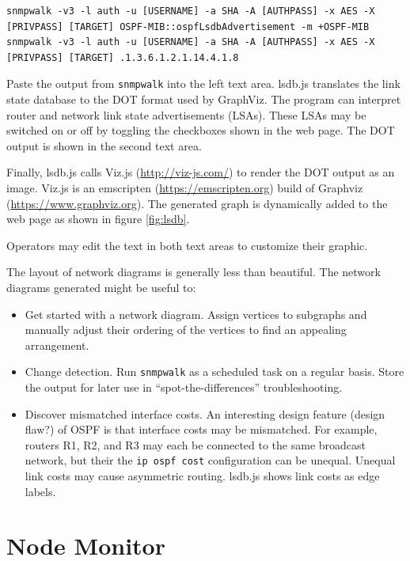 \documentclass[12pt]{article}
\begin{document}
\begin{lstlisting}
snmpwalk -v3 -l auth -u [USERNAME] -a SHA -A [AUTHPASS] -x AES -X [PRIVPASS] [TARGET] OSPF-MIB::ospfLsdbAdvertisement -m +OSPF-MIB
snmpwalk -v3 -l auth -u [USERNAME] -a SHA -A [AUTHPASS] -x AES -X [PRIVPASS] [TARGET] .1.3.6.1.2.1.14.4.1.8
\end{lstlisting}

Paste the output from \texttt{snmpwalk} into the left text area.
lsdb.js translates the link state database to the DOT format used by GraphViz.
The program can interpret router and network link state advertisements (LSAs).
These LSAs may be switched on or off by toggling the checkboxes shown in the web page.
The DOT output is shown in the second text area.

Finally, lsdb.js calls Viz.js (\url{http://viz-js.com/}) to render the DOT output as an image.
Viz.js is an emscripten (\url{https://emscripten.org}) build of Graphviz (\url{https://www.graphviz.org}).
The generated graph is dynamically added to the web page as shown in figure \ref{fig:lsdb}.

Operators may edit the text in both text areas to customize their graphic.

The layout of network diagrams is generally less than beautiful. The network diagrams generated might be useful to:

\begin{itemize}
	\item Get started with a network diagram.
	Assign vertices to subgraphs and manually adjust their ordering of the vertices to find an appealing arrangement.
	\item Change detection. Run \texttt{snmpwalk} as a scheduled task on a regular basis.
	Store the output for later use in ``spot-the-differences'' troubleshooting.
	\item Discover mismatched interface costs.
	An interesting design feature (design flaw?) of OSPF is that interface costs may be mismatched.
	For example, routers R1, R2, and R3 may each be connected to the same broadcast network, but their the \texttt{ip ospf cost} configuration can be unequal.
	Unequal link costs may cause asymmetric routing. lsdb.js shows link costs as edge labels.	
\end{itemize}

\section{Node Monitor}
\end{document}

